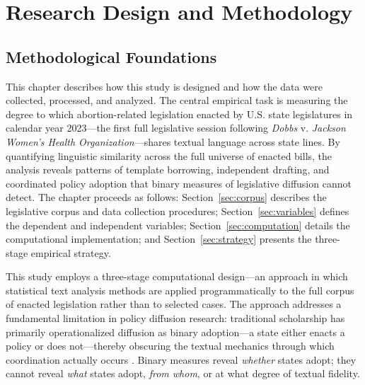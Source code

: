 
\chapter{Research Design and Methodology}
\label{ch:methodology}

\section{Methodological Foundations}

This chapter describes how this study is designed and how the data were collected, processed, and analyzed. The central empirical task is measuring the degree to which abortion-related legislation enacted by U.S. state legislatures in calendar year 2023---the first full legislative session following \emph{Dobbs} v. \emph{Jackson Women's Health Organization}---shares textual language across state lines. By quantifying linguistic similarity across the full universe of enacted bills, the analysis reveals patterns of template borrowing, independent drafting, and coordinated policy adoption that binary measures of legislative diffusion cannot detect. The chapter proceeds as follows: Section~\ref{sec:corpus} describes the legislative corpus and data collection procedures; Section~\ref{sec:variables} defines 
the dependent and independent variables; Section~\ref{sec:computation} details the computational implementation; and Section~\ref{sec:strategy} presents the three-stage empirical strategy.

This study employs a three-stage computational design---an approach in which statistical text analysis methods are applied programmatically to the full corpus of enacted legislation rather than to selected cases. The approach addresses a fundamental limitation in policy diffusion research: traditional scholarship has primarily operationalized diffusion as binary adoption---a state either enacts a policy or does not---thereby obscuring the textual mechanics through which coordination actually occurs \parencite{wilkersonTracingFlowPolicy2015,bousheyPolicyDiffusionDynamics2010a}. Binary measures reveal \textit{whether} states adopt; they cannot reveal \textit{what} states adopt, \textit{from whom}, or at what degree of textual fidelity.

